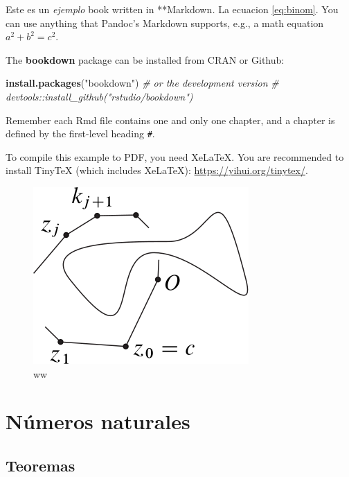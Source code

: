 \documentclass[12pt,]{krantz}
\newenvironment{Shaded}{\begin{snugshade}}{\end{snugshade}}
\newcommand{\CommentTok}[1]{\textcolor[rgb]{0.37,0.37,0.37}{\textit{#1}}}
\newcommand{\KeywordTok}[1]{\textcolor[rgb]{0.27,0.27,0.27}{\textbf{#1}}}
\newcommand{\NormalTok}[1]{#1}
\newcommand{\StringTok}[1]{\textcolor[rgb]{0.5,0.5,0.5}{#1}}
\theoremstyle{definition}
\theoremstyle{definition}
\theoremstyle{definition}
\theoremstyle{remark}
\begin{document}
Este es un \emph{ejemplo} book written in **Markdown\emph{.} La ecuacion \eqref{eq:binom}. You can use anything that Pandoc's Markdown supports, e.g., a math equation \(a^2 + b^2 = c^2\).

The \textbf{bookdown} package can be installed from CRAN or Github:

\begin{Shaded}
\begin{Highlighting}[]
\KeywordTok{install.packages}\NormalTok{(}\StringTok{"bookdown"}\NormalTok{)}
\CommentTok{# or the development version}
\CommentTok{# devtools::install_github("rstudio/bookdown")}
\end{Highlighting}
\end{Shaded}

Remember each Rmd file contains one and only one chapter, and a chapter is defined by the first-level heading \texttt{\#}.

To compile this example to PDF, you need XeLaTeX. You are recommended to install TinyTeX (which includes XeLaTeX): \url{https://yihui.org/tinytex/}.

\begin{figure}

{\centering \includegraphics{abstrac} 

}

\caption{ww}\label{fig:pressure3}
\end{figure}

\hypertarget{nuxfameros-naturales}{%
\chapter{Números naturales}\label{nuxfameros-naturales}}

\hypertarget{teoremas}{%
\section{Teoremas}\label{teoremas}}
\end{document}
